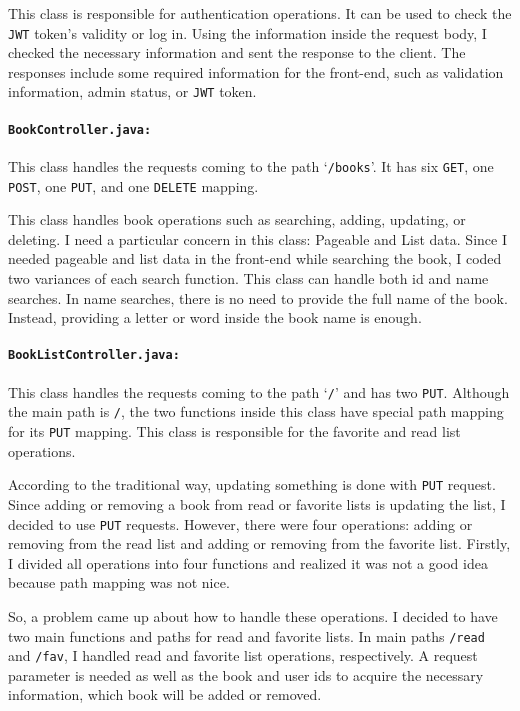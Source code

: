 This class is responsible for authentication operations. It can be used to check the \texttt{JWT} token's validity or log in. Using the information inside the request body, I checked the necessary information and sent the response to the client. The responses include some required information for the front-end, such as validation information, admin status, or \texttt{JWT} token.

\paragraph{\texttt{BookController.java:}} This class handles the requests coming to the path `\texttt{/books}'. It has six \texttt{GET}, one \texttt{POST}, one \texttt{PUT}, and one \texttt{DELETE} mapping. 

This class handles book operations such as searching, adding, updating, or deleting. I need a particular concern in this class: Pageable and List data. Since I needed pageable and list data in the front-end while searching the book, I coded two variances of each search function. This class can handle both id and name searches. In name searches, there is no need to provide the full name of the book. Instead, providing a letter or word inside the book name is enough.

\paragraph{\texttt{BookListController.java:}} This class handles the requests coming to the path `\texttt{/}' and has two \texttt{PUT}. Although the main path is \texttt{/}, the two functions inside this class have special path mapping for its \texttt{PUT} mapping. This class is responsible for the favorite and read list operations. 

According to the traditional way, updating something is done with \texttt{PUT} request. Since adding or removing a book from read or favorite lists is updating the list, I decided to use \texttt{PUT} requests. However, there were four operations: adding or removing from the read list and adding or removing from the favorite list. Firstly, I divided all operations into four functions and realized it was not a good idea because path mapping was not nice. 

So, a problem came up about how to handle these operations. I decided to have two main functions and paths for read and favorite lists. In main paths \texttt{/read} and \texttt{/fav}, I handled read and favorite list operations, respectively. A request parameter is needed as well as the book and user ids to acquire the necessary information, which book will be added or removed.


